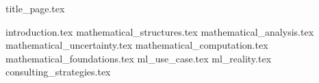 \documentclass{article}
\begin{document}
  \onehalfspacing
  \setlength{\parskip}{1.5em} 


  {title_page.tex}
  


  \tableofcontents

  \newpage


  {introduction.tex}
  {mathematical_structures.tex}
  {mathematical_analysis.tex}
  {mathematical_uncertainty.tex}
  {mathematical_computation.tex}
  {mathematical_foundations.tex}
  {ml_use_case.tex}
  {ml_reality.tex}
  {consulting_strategies.tex}
\end{document}
